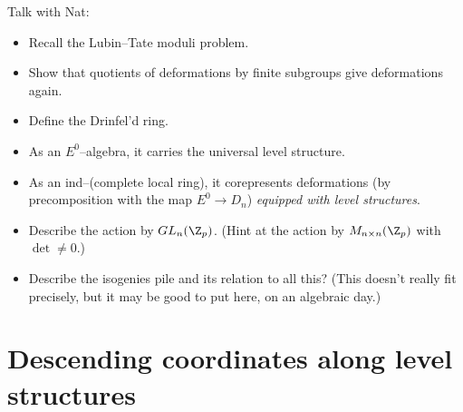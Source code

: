 Talk with Nat:
\begin{itemize}
\item Recall the Lubin--Tate moduli problem.
\item Show that quotients of deformations by finite subgroups give deformations again.
\item Define the Drinfel'd ring.
\item As an $E^0$--algebra, it carries the universal level structure.
\item As an ind--(complete local ring), it corepresents deformations (by precomposition with the map $E^0 \to D_n$) \emph{equipped with level structures}.
\item Describe the action by $GL_n(\Z_p)$. (Hint at the action by $M_{n \times n}(\Z_p)$ with $\det \ne 0$.)
\item Describe the isogenies pile and its relation to all this?  (This doesn't really fit precisely, but it may be good to put here, on an algebraic day.)
\end{itemize}










\section{Descending coordinates along level structures}


